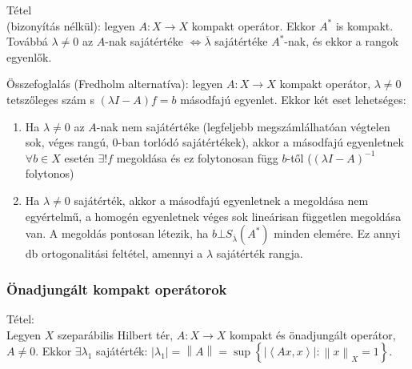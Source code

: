 \documentclass[12pt,a4paper]{scrartcl}
\providecommand{\tightlist}{%
  \setlength{\itemsep}{0pt}\setlength{\parskip}{0pt}}
\newenvironment{tetel}{}{}
\begin{document}
\begin{tetel}

Tétel\\
(bizonyítás nélkül): legyen \(\left. A:X\rightarrow X \right.\) kompakt
operátor. Ekkor \(A^{*}\) is kompakt. Továbbá \(\lambda \neq 0\) az
\(A\)-nak sajátértéke
\(\left. \Leftrightarrow\overline{\lambda} \right.\) sajátértéke
\(A^{*}\)-nak, és ekkor a rangok egyenlők.

\end{tetel}

Összefoglalás (Fredholm alternatíva): legyen
\(\left. A:X\rightarrow X \right.\) kompakt operátor, \(\lambda \neq 0\)
tetszőleges szám s \(\left( {\lambda I - A} \right)f = b\) másodfajú
egyenlet. Ekkor két eset lehetséges:

\begin{enumerate}
\def\labelenumi{\arabic{enumi}.}
\tightlist
\item
  Ha \(\lambda \neq 0\) az \(A\)-nak nem sajátértéke (legfeljebb
  megszámlálhatóan végtelen sok, véges rangú, 0-ban torlódó
  sajátértékek), akkor a másodfajú egyenletnek \(\forall b \in X\)
  esetén \(\exists!f\) megoldása és ez folytonosan függ \(b\)-től
  (\(\left( {\lambda I - A} \right)^{- 1}\) folytonos)
\item
  Ha \(\lambda \neq 0\) sajátérték, akkor a másodfajú egyenletnek a
  megoldása nem egyértelmű, a homogén egyenletnek véges sok lineárisan
  független megoldása van. A megoldás pontosan létezik, ha
  \(b\bot S_{\overline{\lambda}}\left( A^{*} \right)\) minden elemére.
  Ez annyi db ortogonalitási feltétel, amennyi a \(\lambda\) sajátérték
  rangja.
\end{enumerate}

\hypertarget{onadjungalt-kompakt-operatorok}{%
\subsubsection{Önadjungált kompakt
operátorok}\label{onadjungalt-kompakt-operatorok}}

\begin{tetel}

Tétel:\\
Legyen \(X\) szeparábilis Hilbert tér,
\(\left. A:X\rightarrow X \right.\) kompakt és önadjungált operátor,
\(A \neq 0\). Ekkor \(\exists\lambda_{1}\) sajátérték:
\(\left| \lambda_{1} \right| = \left\| A \right\| = \sup\left\{ {\left| \left\langle {Ax,x} \right\rangle \right|:\left\| x \right\|_{X} = 1} \right\}\).

\end{tetel}
\end{document}
